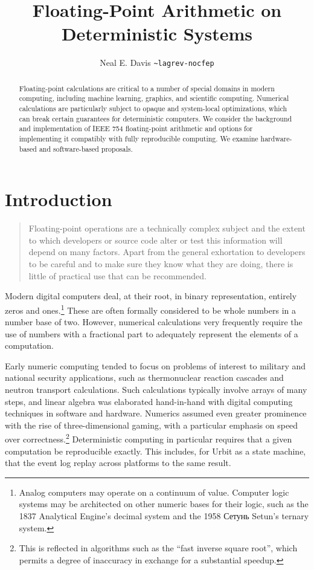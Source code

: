 \documentclass[twoside]{article}
\title{Floating-Point Arithmetic on Deterministic Systems}
\author{Neal E. Davis \texttt{\textasciitilde lagrev-nocfep}}
\begin{document}
\maketitle
\thispagestyle{firststyle}

\begin{abstract}
Floating-point calculations are critical to a number of special domains in modern computing, including machine learning, graphics, and scientific computing.  Numerical calculations are particularly subject to opaque and system-local optimizations, which can break certain guarantees for deterministic computers.  We consider the background and implementation of IEEE 754 floating-point arithmetic and options for implementing it compatibly with fully reproducible computing.  We examine hardware-based and software-based proposals.
\end{abstract}

\section{Introduction}

\begin{quote}
Floating-point operations are a technically complex subject and the extent to which developers or source code alter or test this information will depend on many factors. Apart from the general exhortation to developers to be careful and to make sure they know what they are doing, there is little of practical use that can be recommended.  \citep[p.~197]{Jones2008}
\end{quote}

Modern digital computers deal, at their root, in binary representation, entirely zeros and ones.\footnote{Analog computers may operate on a continuum of value.  Computer logic systems may be architected on other numeric bases for their logic, such as the 1837 Analytical Engine's decimal system and the 1958 Сетунь Setun's ternary system.}  These are often formally considered to be whole numbers in a number base of two.  However, numerical calculations very frequently require the use of numbers with a fractional part to adequately represent the elements of a computation.

Early numeric computing tended to focus on problems of interest to military and national security applications, such as thermonuclear reaction cascades and neutron transport calculations.  Such calculations typically involve arrays of many steps, and linear algebra was elaborated hand-in-hand with digital computing techniques in software and hardware.  Numerics assumed even greater prominence with the rise of three-dimensional gaming, with a particular emphasis on speed over correctness.\footnote{This is reflected in algorithms such as the “fast inverse square root”, which permits a degree of inaccuracy in exchange for a substantial speedup.}  Deterministic computing in particular requires that a given computation be reproducible exactly.  This includes, for Urbit as a state machine, that the event log replay across platforms to the same result.
\end{document}
